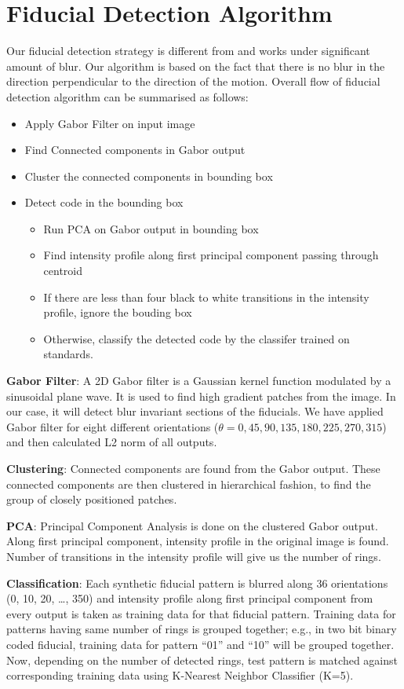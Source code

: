 \documentclass[runningheads]{llncs}
\begin{document}
\section{Fiducial Detection Algorithm}
Our fiducial detection strategy is different from \cite{NaimarkF02} and works
under significant amount of blur. Our algorithm is based on the fact that there
is no blur in the direction perpendicular to the direction of the motion.
Overall flow of fiducial detection algorithm can be summarised as follows:
\begin{itemize}
  \item Apply Gabor Filter on input image
  \item Find Connected components in Gabor output
  \item Cluster the connected components in bounding box
  \item Detect code in the bounding box
  \begin{itemize}
    \item Run PCA on Gabor output in bounding box
    \item Find intensity profile along first principal component passing through
    centroid
    \item If there are less than four black to white transitions in the
    intensity profile, ignore the bouding box
    \item Otherwise, classify the detected code by the classifer trained on
    standards.
  \end{itemize}
\end{itemize}

\textbf{Gabor Filter}: A 2D Gabor filter is a Gaussian kernel function modulated
by a sinusoidal plane wave. It is used to find high gradient patches from the
image. In our case, it will detect blur invariant sections of the fiducials. We
have applied Gabor filter for eight different orientations ($\theta = 0, 45,
90, 135, 180, 225, 270, 315$) and then calculated L2 norm of all outputs.

\textbf{Clustering}: Connected components are found from the Gabor output. 
These connected components are then clustered in hierarchical fashion, to find
the group of closely positioned patches.

\textbf{PCA}: Principal Component Analysis is done on the clustered Gabor
output. Along first principal component, intensity profile in the original image
is found. Number of transitions in the intensity profile will give us the
number of rings.

\textbf{Classification}: Each synthetic fiducial pattern is blurred along 36
orientations (0, 10, 20, \ldots , 350) and intensity profile along first
principal component from every output is taken as training data for that fiducial pattern.
Training data for patterns having same number of rings is grouped together;
e.g., in two bit binary coded fiducial, training data for pattern ``01'' and
``10'' will be grouped together. Now, depending on the number of detected
rings, test pattern is matched against corresponding training data using
K-Nearest Neighbor Classifier (K=5).
\end{document}
